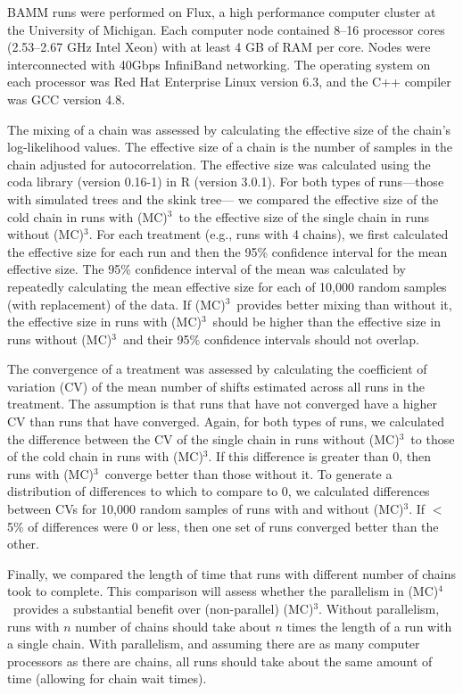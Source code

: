 \documentclass[12pt]{article}
\newcommand{\MCMCMC}{(MC)$^{3}$}
\newcommand{\MCMCMCMC}{(MC)$^{4}$}
\begin{document}
BAMM runs were performed on Flux,
a high performance computer cluster at the University of Michigan.
%
Each computer node contained 8--16 processor cores
(2.53--2.67 GHz Intel Xeon) with at least 4 GB of RAM per core.
%
Nodes were interconnected with 40Gbps InfiniBand networking.
%
The operating system on each processor
was Red Hat Enterprise Linux version 6.3,
and the C++ compiler was GCC version 4.8.


The mixing of a chain was assessed by calculating
the effective size of the chain's log-likelihood values.
%
The effective size of a chain is the number of samples
in the chain adjusted for autocorrelation.
%
The effective size was calculated using
the coda library (version 0.16-1) in R (version 3.0.1).
%
For both types of runs---those with simulated trees and the skink tree---%
we compared the effective size of the cold chain in runs with \MCMCMC\ 
to the effective size of the single chain in runs without \MCMCMC.
%
For each treatment (e.g., runs with 4 chains),
we first calculated the effective size for each run
and then the 95\% confidence interval for the mean effective size.
%
The 95\% confidence interval of the mean was calculated
by repeatedly calculating the mean effective size
for each of 10,000 random samples (with replacement) of the data.
%
If \MCMCMC\ provides better mixing than without it,
the effective size in runs with \MCMCMC\ should be higher
than the effective size in runs without \MCMCMC\ 
and their 95\% confidence intervals should not overlap.


The convergence of a treatment was assessed
by calculating the coefficient of variation (CV) of the mean number of shifts
estimated across all runs in the treatment.
%
The assumption is that runs that have not converged
have a higher CV than runs that have converged.
%
Again, for both types of runs,
we calculated the difference between the CV
of the single chain in runs without \MCMCMC\ 
to those of the cold chain in runs with \MCMCMC.
%
If this difference is greater than 0,
then runs with \MCMCMC\ converge better than those without it.
%
To generate a distribution of differences to which to compare to 0,
we calculated differences between CVs for 10,000 random samples
of runs with and without \MCMCMC.
%
If $<$ 5\% of differences were 0 or less, then
one set of runs converged better than the other.


Finally, we compared the length of time that runs
with different number of chains took to complete.
%
This comparison will assess whether the parallelism in \MCMCMCMC\ 
provides a substantial benefit over (non-parallel) \MCMCMC.
%
Without parallelism, runs with $n$ number of chains
should take about $n$ times the length of a run with a single chain.
%
With parallelism, and assuming there are as many computer processors
as there are chains, all runs should take about the same amount of time
(allowing for chain wait times).
\end{document}

